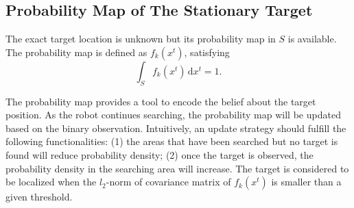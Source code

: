 \documentclass[twocolumn,10pt]{asme2e}
\begin{document}
\subsection*{Probability Map of The Stationary Target}
The exact target location is unknown but its probability map in $S$ is available.
The probability map is defined as $f_k(x^t)$, satisfying
\begin{equation*}
\int_{\mathit{S}} f_k(x^t)\,\mathrm{d}x^t = 1.
\end{equation*}

The probability map provides a tool to encode the belief about the target position.
As the robot continues searching, the probability map will be updated based on the binary observation.
Intuitively, an update strategy should fulfill the following functionalities: (1) the areas that have been searched but no target is found will reduce probability density;
(2) once the target is observed, the probability density in the searching area will increase.
The target is considered to be localized when the $l_2$-norm of covariance matrix of $f_k(x^t)$ is smaller than a given threshold.

\end{document}
